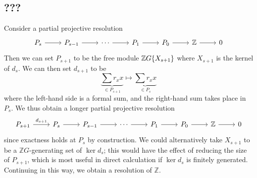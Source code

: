 \subsection{???}
Consider a partial projective resolution
\[\begin{tikzcd}
	{P_s} & {P_{s-1}} & \cdots & {P_1} & {P_0} & {\mathbb Z} & 0
	\arrow[from=1-1, to=1-2]
	\arrow[from=1-2, to=1-3]
	\arrow[from=1-3, to=1-4]
	\arrow[from=1-4, to=1-5]
	\arrow[from=1-5, to=1-6]
	\arrow[from=1-6, to=1-7]
\end{tikzcd}\]
Then we can set \( P_{s+1} \) to be the free module \( \mathbb Z G\qty{X_{s+1}} \) where \( X_{s+1} \) is the kernel of \( d_s \).
We can then set \( d_{s+1} \) to be
\[ \underbrace{\sum r_x x}_{\in P_{s+1}} \mapsto \underbrace{\sum r_x x}_{\in P_s} \]
where the left-hand side is a formal sum, and the right-hand sum takes place in \( P_s \).
We thus obtain a longer partial projective resolution
\[\begin{tikzcd}
	{P_{s+1}} & {P_s} & {P_{s-1}} & \cdots & {P_1} & {P_0} & {\mathbb Z} & 0
	\arrow[from=1-2, to=1-3]
	\arrow[from=1-3, to=1-4]
	\arrow[from=1-4, to=1-5]
	\arrow[from=1-5, to=1-6]
	\arrow[from=1-6, to=1-7]
	\arrow[from=1-7, to=1-8]
	\arrow["{d_{s+1}}", from=1-1, to=1-2]
\end{tikzcd}\]
since exactness holds at \( P_s \) by construction.
We could alternatively take \( X_{s+1} \) to be a \( \mathbb Z G \)-generating set of \( \ker d_s \); this would have the effect of reducing the size of \( P_{s+1} \), which is most useful in direct calculation if \( \ker d_s \) is finitely generated.
Continuing in this way, we obtain a resolution of \( \mathbb Z \).
